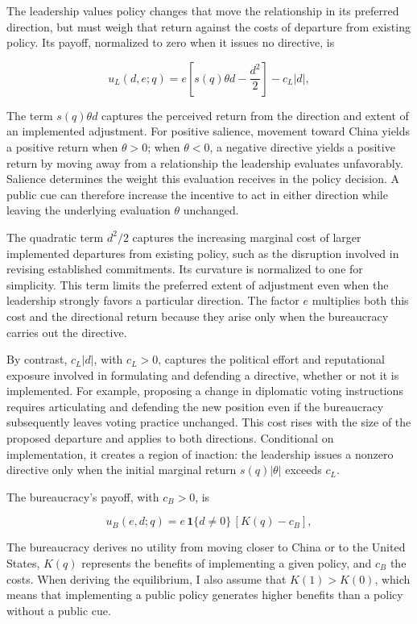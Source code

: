 \documentclass[referee,pdflatex,sn-basic]{sn-jnl}
\theoremstyle{thmstylethree}
\begin{document}
The leadership values policy changes that move the relationship in its preferred direction, but must weigh that return against the costs of departure from existing policy. Its payoff, normalized to zero when it issues no directive, is

\[
u_L(d,e;q)
=
e\left[s(q)\theta d-\frac{d^2}{2}\right]
-c_L|d|,
\tag{1}
\]

The term \(s(q)\theta d\) captures the perceived return from the direction and extent of an implemented adjustment. For positive salience, movement toward China yields a positive return when \(\theta>0\); when \(\theta<0\), a negative directive yields a positive return by moving away from a relationship the leadership evaluates unfavorably. Salience determines the weight this evaluation receives in the policy decision. A public cue can therefore increase the incentive to act in either direction while leaving the underlying evaluation \(\theta\) unchanged.

The quadratic term \(d^2/2\) captures the increasing marginal cost of larger implemented departures from existing policy, such as the disruption involved in revising established commitments. Its curvature is normalized to one for simplicity. This term limits the preferred extent of adjustment even when the leadership strongly favors a particular direction. The factor \(e\) multiplies both this cost and the directional return because they arise only when the bureaucracy carries out the directive.

By contrast, \(c_L|d|\), with \(c_L>0\), captures the political effort and reputational exposure involved in formulating and defending a directive, whether or not it is implemented. For example, proposing a change in diplomatic voting instructions requires articulating and defending the new position even if the bureaucracy subsequently leaves voting practice unchanged. This cost rises with the size of the proposed departure and applies to both directions. Conditional on implementation, it creates a region of inaction: the leadership issues a nonzero directive only when the initial marginal return \(s(q)|\theta|\) exceeds \(c_L\).

The bureaucracy's payoff, with \(c_B>0\), is

\[
u_B(e,d;q)
=
e\,\mathbf{1}\{d\neq0\}\,[K(q)-c_B],
\tag{2}
\]

The bureaucracy derives no utility from moving closer to China or to the United States, \(K(q)\) represents the benefits of implementing a given policy, and \(c_B\) the costs. When deriving the equilibrium, I also assume that \(K(1)>K(0)\), which means that implementing a public policy generates higher benefits than a policy without a public cue.
\end{document}
